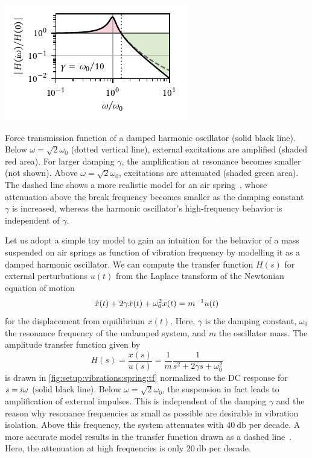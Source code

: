 \begin{marginfigure}
    \centering
    \includegraphics{img/pdf/setup/spring_tf}
    \caption[]{
        Force transmission function of a damped harmonic oscillator (solid black line).
        Below $\omega=\sqrt{2}\omega_0$ (dotted vertical line), external excitations are amplified (shaded red area).
        For larger damping $\gamma$, the amplification at resonance becomes smaller (not shown).
        Above $\omega=\sqrt{2}\omega_0$, excitations are attenuated (shaded green area).
        The dashed line shows a more realistic model for an air spring~\cite{FabreekaAirSprings}, whose attenuation above the break frequency becomes smaller as the damping constant $\gamma$ is increased, whereas the harmonic oscillator's high-frequency behavior is independent of $\gamma$.
    }
    \label{fig:setup:vibrations:spring:tf}
\end{marginfigure}

Let us adopt a simple toy model to gain an intuition for the behavior of a mass suspended on air springs as function of vibration frequency by modelling it as a damped harmonic oscillator.
We can compute the transfer function $H(s)$ for external perturbations $u(t)$ from the Laplace transform of the Newtonian equation of motion
\begin{equation}\label{eq:setup:spring:eom}
    \ddot{x}(t) + 2\gamma\dot{x}(t) + \omega_0^2 x(t) = m^{-1} u(t)
\end{equation}
for the displacement from equilibrium $x(t)$.
Here, $\gamma$ is the damping constant, $\omega_0$ the resonance frequency of the undamped system, and $m$ the oscillator mass.
The amplitude transfer function given by
\begin{equation}\label{eq:setup:spring:tf}
    H(s) = \frac{x(s)}{u(s)} = \frac{1}{m}\frac{1}{s^2 + 2\gamma s + \omega_0^2}
\end{equation}
is drawn in \cref{fig:setup:vibrations:spring:tf} normalized to the DC response for $s=i\omega$ (solid black line).
Below $\omega=\sqrt{2}\omega_0$, the suspension in fact leads to amplification of external impulses.
This is independent of the damping $\gamma$ and the reason why resonance frequencies as small as possible are desirable in vibration isolation.
Above this frequency, the system attenuates with $\qty{40}{\decibel}$ per decade.
A more accurate model results in the transfer function drawn as a dashed line~.
Here, the attenuation at high frequencies is only $\qty{20}{\decibel}$ per decade.

